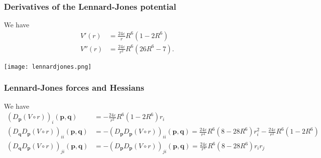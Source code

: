 \documentclass[a4paper]{article}
\newcommand{\boldp}{\boldsymbol{p}}
\newcommand{\boldq}{\boldsymbol{q}}
\begin{document}
\subsubsection{Derivatives of the Lennard-Jones potential}
\label{sec-1-1-3}
We have
\begin{align}
  V'(r) &= \frac{24 \varepsilon}{r} R^6 \left(1 - 2 R^6\right) \\
  V''(r) &= \frac{24 \varepsilon}{r^2} R^6 \left( 26 R^6 - 7 \right).
\end{align}

\texttt{[image: lennardjones.png]}

\subsubsection{Lennard-Jones forces and Hessians}
\label{sec-1-1-4}
We have
\begin{align}
  (D_{\boldp} (V \circ r))_i(\boldp, \boldq) &= - \frac{24 \varepsilon}{r^2} R^6 \left(1 - 2 R^6\right)r_i \\
  (D_{\boldq}D_{\boldp} (V\circ r))_{ii}(\boldp, \boldq) &= - (D_{\boldp}D_{\boldp} (V\circ r))_{ii}(\boldp, \boldq) = \frac{24 \varepsilon}{r^4} R^6 \left(8 - 28 R^6\right)r_i^2 - \frac{24 \varepsilon}{r^2} R^6 \left(1 - 2 R^6\right) \\
  (D_{\boldq}D_{\boldp} (V\circ r))_{ji}(\boldp, \boldq) &= - (D_{\boldp}D_{\boldp} (V\circ r))_{ji}(\boldp, \boldq) = \frac{24 \varepsilon}{r^4} R^6 \left(8 - 28 R^6\right)r_ir_j
\end{align}
\end{document}
